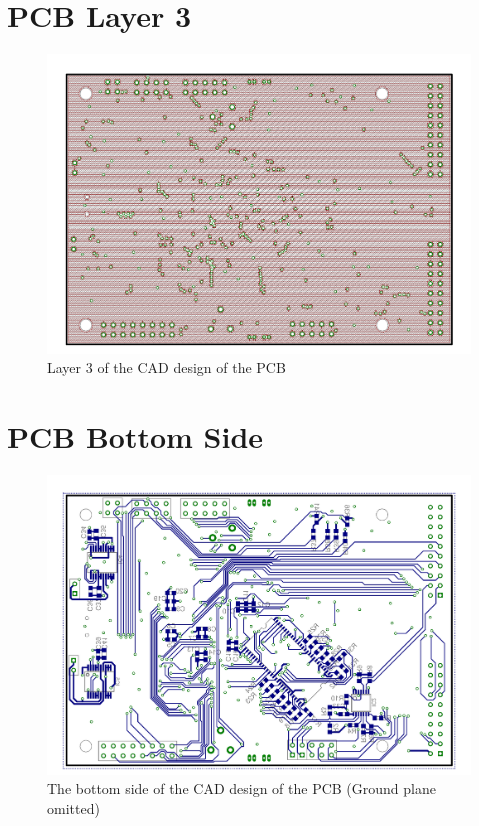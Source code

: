 \section{PCB Layer 3}
\begin{figure}[ht!]
\centering
\includegraphics[angle=90,width=\textwidth,height=\textheight-5cm,keepaspectratio]{Figures/PCB_GND.pdf} 
\caption{Layer 3 of the CAD design of the PCB}
\label{fig:PCB:Eagle:Bottom}
\end{figure}
\clearpage
\section{PCB Bottom Side}
\begin{figure}[ht!]
\centering
\includegraphics[angle=90,width=\textwidth,height=\textheight-5cm,keepaspectratio]{Figures/PCB_Bottom.pdf} 
\caption{The bottom side of the CAD design of the PCB (Ground plane omitted)}
\label{fig:PCB:Eagle:Bottom}
\end{figure}
\clearpage